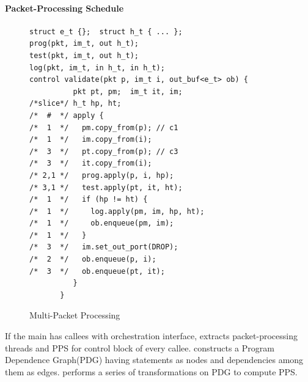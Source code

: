 \documentclass[letterpaper,twocolumn,10pt]{article}
\begin{document}
% 
% 





\paragraph*{Packet-Processing Schedule}
\label{subsubsection:packet-processing-schedule}


\begin{figure}[!h]
\begin{lstlisting}[frame=none]
struct e_t {};  struct h_t { ... };
prog(pkt, im_t, out h_t);
test(pkt, im_t, out h_t);
log(pkt, im_t, in h_t, in h_t);
control validate(pkt p, im_t i, out_buf<e_t> ob) {
          pkt pt, pm;  im_t it, im;  
/*slice*/ h_t hp, ht;
/*  #  */ apply {
/*  1  */   pm.copy_from(p); // c1
/*  1  */   im.copy_from(i);
/*  3  */   pt.copy_from(p); // c3 
/*  3  */   it.copy_from(i);
/* 2,1 */   prog.apply(p, i, hp); 
/* 3,1 */   test.apply(pt, it, ht); 
/*  1  */   if (hp != ht) {
/*  1  */     log.apply(pm, im, hp, ht);
/*  1  */     ob.enqueue(pm, im);
/*  1  */   }
/*  3  */   im.set_out_port(DROP);
/*  2  */   ob.enqueue(p, i);
/*  3  */   ob.enqueue(pt, it);
          }
       }
\end{lstlisting}
\caption{Multi-Packet Processing}
\label{fig:multi-packet-processing}
\end{figure}





If the main \uprogram has callees with orchestration interface, 
\ucomp 
extracts packet-processing threads and PPS for control block of every callee.
\ucomp constructs a Program Dependence Graph(PDG) 
\cite{Ferrante:1987:PDG:24039.24041} having statements as nodes and 
dependencies among them as edges. \ucomp  performs a series of transformations on PDG to compute PPS.
\end{document}
